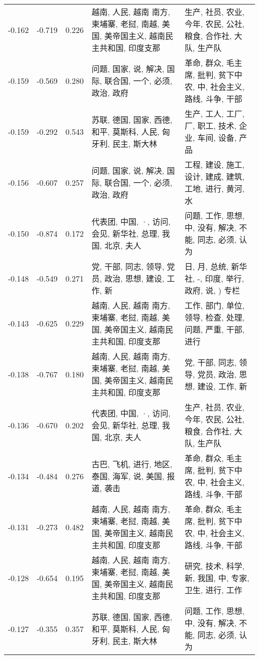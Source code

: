 \begin{tabular}{cccp{5cm}p{5cm}}
-0.162 & -0.719 & 0.226 & 越南, 人民, 越南 南方, 柬埔寨, 老挝, 南越, 美国, 美帝国主义, 越南民主共和国, 印度支那 & 生产, 社员, 农业, 今年, 农民, 公社, 粮食, 合作社, 大队, 生产队 \\
-0.159 & -0.569 & 0.280 & 问题, 国家, 说, 解决, 国际, 联合国, 一个, 必须, 政治, 政府 & 革命, 群众, 毛主席, 批判, 贫下中农, 中, 社会主义, 路线, 斗争, 干部 \\
-0.159 & -0.292 & 0.543 & 苏联, 德国, 国家, 西德, 和平, 莫斯科, 人民, 匈牙利, 民主, 斯大林 & 生产, 工人, 工厂, 厂, 职工, 技术, 企业, 车间, 设备, 产品 \\
-0.156 & -0.607 & 0.257 & 问题, 国家, 说, 解决, 国际, 联合国, 一个, 必须, 政治, 政府 & 工程, 建设, 施工, 设计, 建成, 建筑, 工地, 进行, 黄河, 水 \\
-0.150 & -0.874 & 0.172 & 代表团, 中国, ·, 访问, 会见, 新华社, 总理, 我国, 北京, 夫人 & 问题, 工作, 思想, 中, 没有, 解决, 不能, 同志, 必须, 认为 \\
-0.148 & -0.549 & 0.271 & 党, 干部, 同志, 领导, 党员, 政治, 思想, 建设, 工作, 新 & 日, 月, 总统, 新华社, -, 印度, 举行, 政府, 说, ) 专栏 \\
-0.143 & -0.625 & 0.229 & 越南, 人民, 越南 南方, 柬埔寨, 老挝, 南越, 美国, 美帝国主义, 越南民主共和国, 印度支那 & 工作, 部门, 单位, 领导, 检查, 处理, 问题, 严重, 干部, 进行 \\
-0.138 & -0.767 & 0.180 & 越南, 人民, 越南 南方, 柬埔寨, 老挝, 南越, 美国, 美帝国主义, 越南民主共和国, 印度支那 & 党, 干部, 同志, 领导, 党员, 政治, 思想, 建设, 工作, 新 \\
-0.136 & -0.670 & 0.202 & 代表团, 中国, ·, 访问, 会见, 新华社, 总理, 我国, 北京, 夫人 & 生产, 社员, 农业, 今年, 农民, 公社, 粮食, 合作社, 大队, 生产队 \\
-0.134 & -0.484 & 0.276 & 古巴, 飞机, 进行, 地区, 泰国, 海军, 说, 美国, 报道, 袭击 & 革命, 群众, 毛主席, 批判, 贫下中农, 中, 社会主义, 路线, 斗争, 干部 \\
-0.131 & -0.273 & 0.482 & 越南, 人民, 越南 南方, 柬埔寨, 老挝, 南越, 美国, 美帝国主义, 越南民主共和国, 印度支那 & 革命, 群众, 毛主席, 批判, 贫下中农, 中, 社会主义, 路线, 斗争, 干部 \\
-0.128 & -0.654 & 0.195 & 越南, 人民, 越南 南方, 柬埔寨, 老挝, 南越, 美国, 美帝国主义, 越南民主共和国, 印度支那 & 研究, 技术, 科学, 新, 我国, 中, 专家, 卫生, 进行, 工作 \\
-0.127 & -0.355 & 0.357 & 苏联, 德国, 国家, 西德, 和平, 莫斯科, 人民, 匈牙利, 民主, 斯大林 & 问题, 工作, 思想, 中, 没有, 解决, 不能, 同志, 必须, 认为 \\

\end{tabular}
